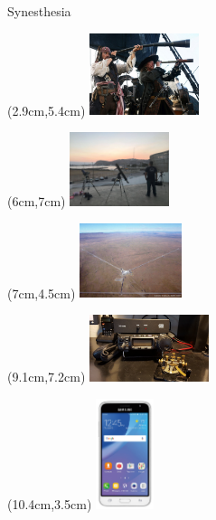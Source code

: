 \documentclass{beamer}
\begin{document}
\begin{frame}[t]{Synesthesia}
{   \begin{textblock*}{10cm}(2.9cm,5.4cm) %
   \includegraphics[width=3.2cm]{figures/spyglass.jpg}
   \end{textblock*}
   \begin{textblock*}{10cm}(6cm,7cm) %
   \includegraphics[width=2.9cm]{figures/telescope.jpg}
   \end{textblock*}
   \begin{textblock*}{10cm}(7cm,4.5cm) %
   \includegraphics[width=3cm]{figures/gravity.jpg}
   \end{textblock*}
   \begin{textblock*}{10cm}(9.1cm,7.2cm) %
   \includegraphics[width=3.5cm]{figures/radio.jpg}
   \end{textblock*}
   \begin{textblock*}{10cm}(10.4cm,3.5cm) %
   \includegraphics[width=1.7cm]{figures/smartphones.jpg}
   \end{textblock*}
   }
\end{frame}
\end{document}

